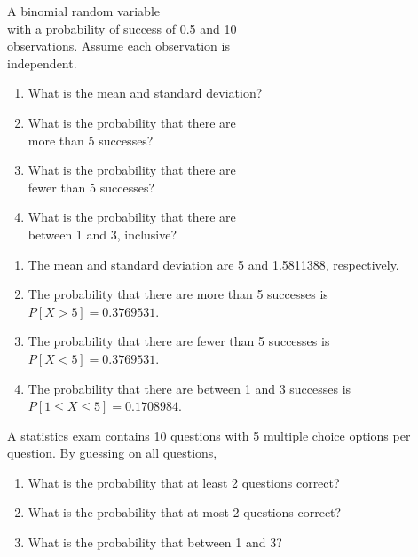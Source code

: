 \documentclass[11pt, chapterprefix=true]{scrbook}\usepackage[]{graphicx}\usepackage[]{color}
\begin{document}
\begin{exercises}

  \begin{exercise} %

A binomial random variable \\ with a probability of success of 0.5 and 10 \\ observations. Assume each observation is \\ independent.

	  \begin{enumerate}
	  \item What is the mean and standard deviation?
    \item What is the probability that there are \\ more than 5 successes?
    \item What is the probability that there are \\ fewer than 5 successes?
    \item What is the probability that there are \\ between 1 and 3, inclusive?
	  \end{enumerate}

	\end{exercise}
	\begin{solution}  %


		\begin{enumerate}
	  \item The mean and standard deviation are 5 and 1.5811388, respectively.
    \item The probability that there are more than 5 successes is $P[ X > 5 ] = 0.3769531$.
    \item The probability that there are fewer than 5 successes is $P[ X < 5 ] = 0.3769531$.
    \item The probability that there  are between 1 and 3 successes  is $P[ 1 \le X \le 5 ] = 0.1708984$.
	  \end{enumerate}
	\end{solution}

  \begin{exercise} %

A statistics exam contains 10 questions with 5 multiple choice options per question. By guessing on all questions,

\begin{enumerate}
\item What is the probability that at least 2 questions correct?
\item What is the probability that at most 2 questions correct?
\item What is the probability that between 1 and 3?
\end{enumerate}
	\end{exercise}
	\begin{solution}  %



\end{solution}
\end{exercises}
\end{document}
